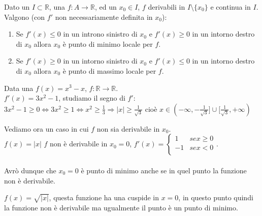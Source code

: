 \begin{proposition}
Dato un $I \subset \mathbb{R}$, una $f: A \to \mathbb{R}$, ed un $x_0 \in I$, $f$ derivabili in $I \setminus \{x_0\}$ e continua in $I$. Valgono (con $f'$ non necessariamente definita in $x_0$):
\begin{enumerate}
    \item Se $f'(x) \leq 0$ in un introno sinistro di $x_0$ e $f'(x) \geq 0$ in un intorno destro di $x_0$ allora $x_0$ è punto di minimo locale per $f$.
    \item Se $f'(x) \geq 0$ in un intorno sinistro di $x_0$ e $f'(x) \leq 0$ in un intorno destro  di $x_0$ allora $x_0$ è punto di massimo locale per $f$.
\end{enumerate}
\end{proposition}

\begin{example}
Data una $f(x) = x^3 - x$, $f: \mathbb{R} \to \mathbb{R}$.\\
$f'(x) = 3x^2 - 1$, studiamo il segno di $f'$:
$3x^2 - 1 \geq 0 \Longleftrightarrow 3x^2 \geq 1 \Longleftrightarrow x^2 \geq \frac{1}{3} \Longrightarrow |x| \geq \frac{1}{\sqrt{3}}$ cioè $x \in (-\infty, -\frac{1}{\sqrt{3}}] \cup [\frac{1}{\sqrt{3}}, +\infty)$
\end{example}

\begin{example}
Vediamo ora un caso in cui $f$ non sia derivabile in $x_0$.\\
$f(x) = |x|$ $f$ non è derivabile in $x_0 = 0$, $f'(x) = \begin{cases} 1 & se x \geq 0 \\ -1 & se x < 0\\\end{cases}$.\\\\
Avrò dunque che $x_0 = 0$ è punto di minimo anche se in quel punto la funzione non è derivabile.
\end{example}

\begin{example}
$f(x) = \sqrt{|x|}$, questa funzione ha una cuspide in $x = 0$, in questo punto quindi la funzione non è derivabile ma ugualmente il punto è un punto di minimo.
\end{example}

